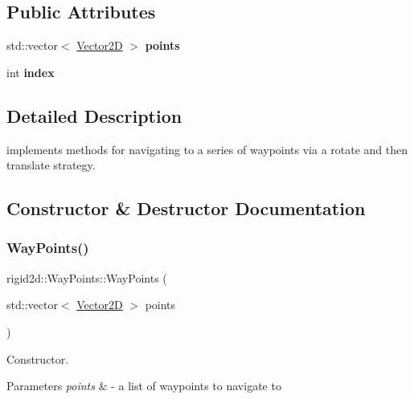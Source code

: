 \subsection*{Public Attributes}
\begin{DoxyCompactItemize}
\item 
\mbox{\label{classrigid2d_1_1WayPoints_a5c021a785b45910ea869b5485146680c}} 
std\+::vector$<$ \hyperlink{structrigid2d_1_1Vector2D}{Vector2D} $>$ {\bfseries points}
\item 
\mbox{\label{classrigid2d_1_1WayPoints_ab13ae3823d5d7b703a0d94865b03ee41}} 
int {\bfseries index}
\end{DoxyCompactItemize}


\subsection{Detailed Description}
implements methods for navigating to a series of waypoints via a rotate and then translate strategy. 

\subsection{Constructor \& Destructor Documentation}
\mbox{\label{classrigid2d_1_1WayPoints_abdfac145bd6c5ab064876e7c9934dcd9}} 
\subsubsection{\texorpdfstring{Way\+Points()}{WayPoints()}}
{\footnotesize\ttfamily rigid2d\+::\+Way\+Points\+::\+Way\+Points (\begin{DoxyParamCaption}\item[{std\+::vector$<$ \hyperlink{structrigid2d_1_1Vector2D}{Vector2D} $>$}]{points }\end{DoxyParamCaption})}



Constructor. 


\begin{DoxyParams}{Parameters}
{\em points} & -\/ a list of waypoints to navigate to \\
\hline
\end{DoxyParams}


